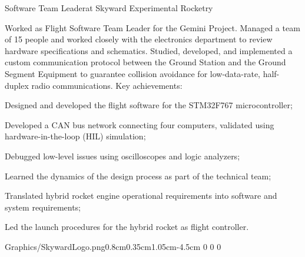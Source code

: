 \documentclass[10pt,onesize,a4paper,titlepage]{article}
\begin{document}
    \vspace{-0.75cm}
    \begin{tcolorbox}[grow to left by=0.55cm,colframe=white,colback=white]

        {Software Team Leader}{at Skyward Experimental Rocketry}
        {
            Worked as Flight Software Team Leader for the Gemini Project. Managed a team of 15 people and worked closely with the electronics department to review hardware specifications and schematics. Studied, developed, and implemented a custom communication protocol between the Ground Station and the Ground Segment Equipment to guarantee collision avoidance for low-data-rate, half-duplex radio communications.
            \newline
            \newline Key achievements: 
            {
                \begin{compactitem}[-]
                    \item Designed and developed the flight software for the STM32F767 microcontroller;
                    \item Developed a CAN bus network connecting four computers, validated using hardware-in-the-loop (HIL) simulation;
                    \item Debugged low-level issues using oscilloscopes and logic analyzers;
                    \item Learned the dynamics of the design process as part of the technical team;
                    \item Translated hybrid rocket engine operational requirements into software and system requirements;
                    \item Led the launch procedures for the hybrid rocket as flight controller.
                    \newline
                \end{compactitem}
            }
        }
        {Graphics/SkywardLogo.png}{0.8cm}{0.35cm}{1.05cm}{-4.5cm 0 0 0}
    \vspace{-0.75cm}
    \end{tcolorbox}
\end{document}
